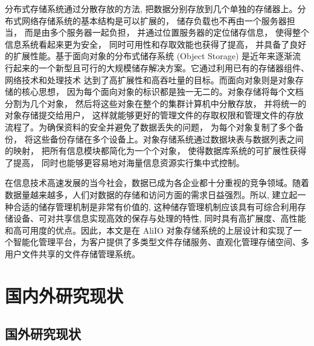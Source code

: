 分布式存储系统通过分散存放的方法, 把数据分别存放到几个单独的存储器上。分布式网络存储系统的基本结构是可以扩展的， 储存负载也不再由一个服务器担当， 而是由多个服务器一起负担， 并通过位置服务器的定位储存信息， 使得整个信息系统看起来更为安全， 同时可用性和存取效能也获得了提高， 并具备了良好的扩展性能。基于面向对象的分布式储存系统 (Object Storage) 是近年来逐渐流行起来的一个新型且可行的大规模储存解决方案。它通过利用已有的存储器组件、网络技术和处理技术 达到了高扩展性和高吞吐量的目标。而面向对象则是对象存储的核心思想， 因为每个面向对象的标识都是独一无二的。对象存储将每个文档分割为几个对象， 然后将这些对象在整个的集群计算机中分散存放， 并将统一的对象存储提交给用户， 这样就能够更好的管理文件的存取权限和管理文件的存放流程了。为确保资料的安全并避免了数据丢失的问题， 为每个对象复制了多个备份， 将这些备份存储在多个设备上。对象存储系统通过数据块表与数据列表之间的映射， 把所有信息模块都简化为一个个对象， 使得数据库系统的可扩展性获得了提高， 同时也能够更容易地对海量信息资源实行集中式控制。

在信息技术高速发展的当今社会，数据已成为各企业都十分重视的竞争领域。随着数据量越来越多，人们对数据的存储和访问方面的需求日益强烈。所以, 建立起一种合适的储存管理机制是非常有价值的, 这种储存管理机制应该具有可综合利用存储设备、可对共享信息实现高效的保存与处理的特性, 同时具有高扩展度、高性能和高可用度的优点。因此，本文是在 AliIO 对象存储系统的上层设计和实现了一个智能化管理平台，为客户提供了多类型文件存储服务、直观化管理存储空间、多用户文件共享的文件存储管理系统。

\section{国内外研究现状}
\subsection{国外研究现状}


